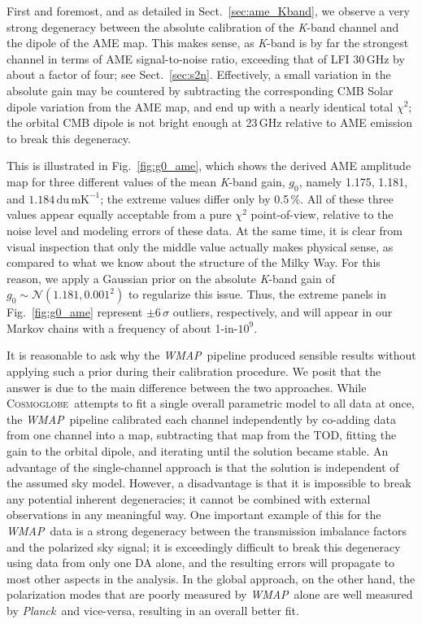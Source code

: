 \documentclass[twocolumn]{../../common/aa}
\def\WMAP{\emph{WMAP}}
\def\Planck{\emph{Planck}}
\newcommand{\cosmoglobe}{\textsc{Cosmoglobe}}
\newcommand{\K}[0]{\textit K}
\begin{document}
First and foremost, and as detailed in Sect.~\ref{sec:ame_Kband}, we observe a very strong degeneracy between the absolute calibration of the \K-band channel and the dipole of the AME map. This makes sense, as \K-band is by far the strongest channel in terms of AME signal-to-noise ratio, exceeding that of LFI 30\,GHz by about a factor of four; see Sect.~\ref{sec:s2n}. Effectively, a small variation in the absolute gain may be countered by subtracting the corresponding CMB Solar dipole variation from the AME map, and end up with a nearly identical total $\chi^2$; the orbital CMB dipole is not bright enough at 23\,GHz relative to AME emission to break this degeneracy.

This is illustrated in Fig.~\ref{fig:g0_ame}, which shows the derived AME amplitude map for three different values of the mean \K-band gain, $g_0$, namely 1.175, 1.181, and $1.184\,\mathrm{du\,mK^{-1}}$; the extreme values differ only by 0.5\,\%. All of these three values appear equally acceptable from a pure $\chi^2$ point-of-view, relative to the noise level and modeling errors of these data. At the same time, it is clear from visual inspection that only the middle value actually makes physical sense, as compared to what we know about the structure of the Milky Way. For this reason, we apply a Gaussian prior on the absolute \K-band gain of $g_0 \sim \mathcal N(1.181, 0.001^2)$ to regularize this issue. Thus, the extreme panels in Fig.~\ref{fig:g0_ame} represent $\pm6\,\sigma$ outliers, respectively, and will appear in our Markov chains with a frequency of about 1-in-$10^9$.

It is reasonable to ask why the \WMAP\ pipeline produced sensible results without applying such a prior during their calibration procedure. We posit that the answer is due to the main difference between the two approaches. While \cosmoglobe\ attempts to fit a single overall parametric model to all data at once, the \WMAP\ pipeline calibrated each channel independently by co-adding data from one channel into a map, subtracting that map from the TOD, fitting the gain to the orbital dipole, and iterating until the solution became stable. An advantage of the single-channel approach is that the solution is independent of the assumed sky model. However, a disadvantage is that it is impossible to break any potential inherent degeneracies; it cannot be combined with external observations in any meaningful way. One important example of this for the \WMAP\ data is a strong degeneracy between the transmission imbalance factors and the polarized sky signal; it is exceedingly difficult to break this degeneracy using data from only one DA alone, and the resulting errors will propagate to most other aspects in the analysis. In the global approach, on the other hand, the polarization modes that are poorly measured by \WMAP\ alone are well measured by \Planck\ and vice-versa, resulting in an overall better fit. 
\end{document}
